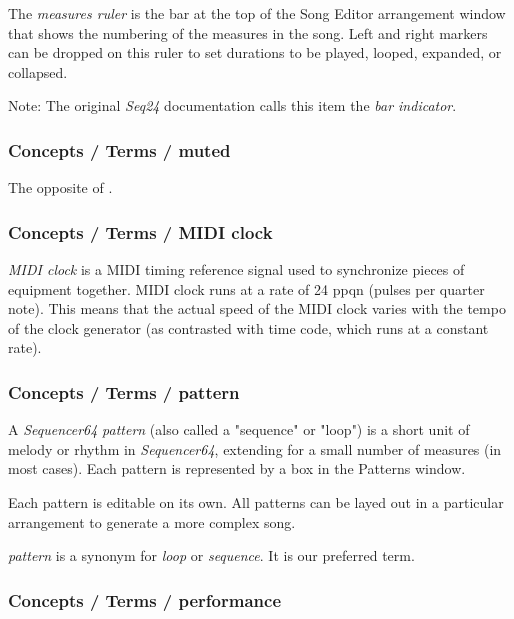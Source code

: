    The \textsl{measures ruler} is the bar at the top of the Song Editor
   arrangement window that shows the numbering of the measures in the song.
   Left and right markers can be dropped on this ruler to set durations to
   be played, looped, expanded, or collapsed.

   Note:
   The original \textsl{Seq24} documentation calls this item the
   \textsl{bar indicator}.

\subsubsection{Concepts / Terms / muted}
\label{subsubsec:concepts_terms_muted}

   The opposite of .

\subsubsection{Concepts / Terms / MIDI clock}
\label{subsubsec:concepts_terms_midi_clock}

   \textsl{MIDI clock} is
   a MIDI timing reference signal used to synchronize pieces of equipment
   together. MIDI clock runs at a rate of 24 ppqn (pulses per quarter note).
   This means that the actual speed of the MIDI clock varies with the tempo
   of the clock generator (as contrasted with time code, which runs at a
   constant rate).

\subsubsection{Concepts / Terms / pattern}
\label{subsubsec:concepts_terms_pattern}

   A \textsl{Sequencer64} \textsl{pattern}
   (also called a "sequence" or "loop")
   is a short unit of melody or rhythm in \textsl{Sequencer64},
   extending for a small number of measures (in most cases).
   Each pattern is represented by a box in the Patterns window.

   Each pattern is editable on its own.  All patterns can be layed out in
   a particular arrangement to generate a more complex song.

   \textsl{pattern} is a synonym for \textsl{loop} or \textsl{sequence}.
   It is our preferred term.

\subsubsection{Concepts / Terms / performance}
\label{subsubsec:concepts_terms_performance}

